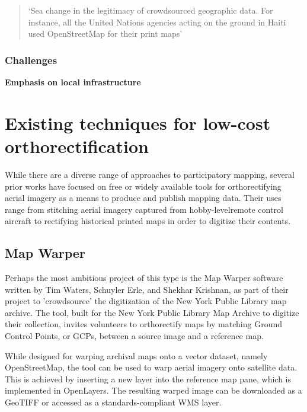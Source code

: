 \documentclass[11pt]{report}
\begin{document}
\begin{quote}`Sea change in the legitimacy of crowdsourced geographic data. For instance, all the United Nations agencies acting on the ground in Haiti used OpenStreetMap for their print maps'\end{quote} \cite{glennon2010grassrootscrisis}

\subsubsection{Challenges}
\textbf{Emphasis on local infrastructure}

\section{Existing techniques for low-cost orthorectification}
\label{sec:existingtechniques}

While there are a diverse range of approaches to participatory mapping, several prior works have focused on free or widely available tools for orthorectifying aerial imagery as a means to produce and publish mapping data. Their uses range from stitching aerial imagery captured from hobby-levelremote control aircraft to rectifying historical printed maps in order to digitize their contents.

\subsection{Map Warper}
\label{subsec:mapwarper}

Perhaps the most ambitious project of this type is the Map Warper software written by Tim Waters, Schuyler Erle, and Shekhar Krishnan, as part of their project to 'crowdsource' the digitization of the New York Public Library map archive. \cite{waters2009warper} The tool, built for the New York Public Library Map Archive to digitize their collection, invites volunteers to orthorectify maps by matching Ground Control Points, or GCPs, between a source image and a reference map. 

While designed for warping archival maps onto a vector dataset, namely OpenStreetMap, the tool can be used to warp aerial imagery onto satellite data. This is achieved by inserting a new layer into the reference map pane, which is implemented in OpenLayers. The resulting warped image can be downloaded as a \ac{GeoTIFF} or accessed as a standards-compliant WMS layer. 
\end{document}
